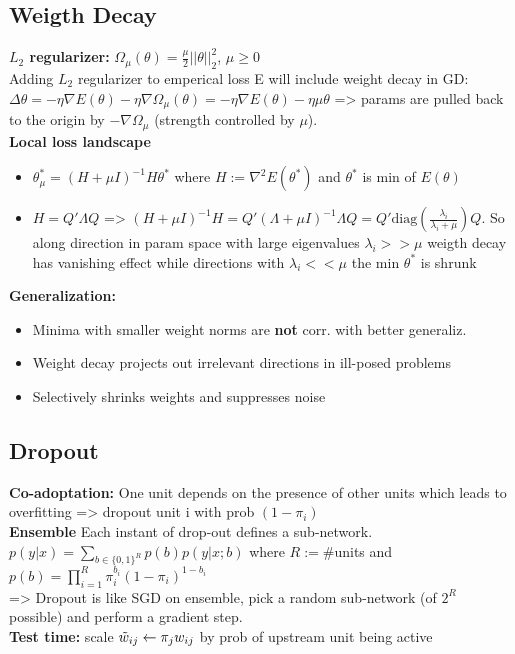 \subsection{Weigth Decay}
\textbf{$L_2$ regularizer:} $\Omega_{\mu}(\theta) = \frac{\mu}{2}||\theta||_2^2$, $\mu \geq 0$\\
Adding $L_2$ regularizer to emperical loss E will include weight decay in GD: $\Delta \theta = -\eta\nabla E(\theta) - \eta\nabla\Omega_{\mu}(\theta) = -\eta \nabla E(\theta) - \eta \mu\theta$ => params are pulled back to the origin by $-\nabla \Omega_{\mu}$ (strength controlled by $\mu$).\\
\textbf{Local loss landscape}
\begin{itemize}
    \item $\theta^*_{\mu} = (H + \mu I)^{-1}H\theta^*$ where $H := \nabla^2E(\theta^*)$ and $\theta^*$ is min of $E(\theta)$
    \item $H = Q'\Lambda Q$ => $(H + \mu I)^{-1}H = Q'(\Lambda + \mu I)^{-1}\Lambda Q = Q' \text{diag}(\frac{\lambda_i}{\lambda_i + \mu})Q$. So along direction in param space with large eigenvalues $\lambda_i >> \mu$ weigth decay has vanishing effect while directions with $\lambda_i << \mu$ the min $\theta^*$ is shrunk
\end{itemize}
\textbf{Generalization: }
\begin{itemize}
    \item Minima with smaller weight norms are \textbf{not} corr. with better generaliz.
    \item Weight decay projects out irrelevant directions in ill-posed problems
    \item Selectively shrinks weights and suppresses noise
\end{itemize}
\subsection{Dropout}
\textbf{Co-adoptation:} One unit depends on the presence of other units which leads to overfitting => dropout unit i with prob $(1-\pi_i)$\\
\textbf{Ensemble} Each instant of drop-out defines a sub-network. $p(y|x) = \sum_{b\in \{0,1\}^R} p(b)p(y|x;b)$ where $R := \#$units and $p(b) = \prod_{i = 1}^R \pi_i^{b_i}(1-\pi_i)^{1-b_i}$\\
=> Dropout is like SGD on ensemble, pick a random sub-network (of $2^R$ possible) and perform a gradient step.\\
\textbf{Test time:} scale $\Tilde{w}_{ij} \leftarrow \pi_jw_{ij}$ by prob of upstream unit being active

